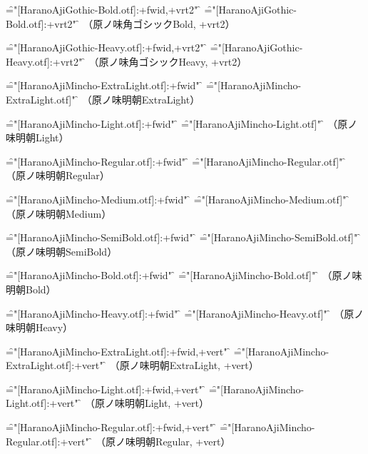 \font\f="[HaranoAjiGothic-Bold.otf]:+fwid,+vrt2" \f
\testfwid
\font\f="[HaranoAjiGothic-Bold.otf]:+vrt2" \f
\test
（原ノ味角ゴシックBold, +vrt2）\par

\font\f="[HaranoAjiGothic-Heavy.otf]:+fwid,+vrt2" \f
\testfwid
\font\f="[HaranoAjiGothic-Heavy.otf]:+vrt2" \f
\test
（原ノ味角ゴシックHeavy, +vrt2）\par


\font\f="[HaranoAjiMincho-ExtraLight.otf]:+fwid" \f
\testfwid
\font\f="[HaranoAjiMincho-ExtraLight.otf]" \f
\test
（原ノ味明朝ExtraLight）\par

\font\f="[HaranoAjiMincho-Light.otf]:+fwid" \f
\testfwid
\font\f="[HaranoAjiMincho-Light.otf]" \f
\test
（原ノ味明朝Light）\par

\font\f="[HaranoAjiMincho-Regular.otf]:+fwid" \f
\testfwid
\font\f="[HaranoAjiMincho-Regular.otf]" \f
\test
（原ノ味明朝Regular）\par

\font\f="[HaranoAjiMincho-Medium.otf]:+fwid" \f
\testfwid
\font\f="[HaranoAjiMincho-Medium.otf]" \f
\test
（原ノ味明朝Medium）\par

\font\f="[HaranoAjiMincho-SemiBold.otf]:+fwid" \f
\testfwid
\font\f="[HaranoAjiMincho-SemiBold.otf]" \f
\test
（原ノ味明朝SemiBold）\par

\font\f="[HaranoAjiMincho-Bold.otf]:+fwid" \f
\testfwid
\font\f="[HaranoAjiMincho-Bold.otf]" \f
\test
（原ノ味明朝Bold）\par

\font\f="[HaranoAjiMincho-Heavy.otf]:+fwid" \f
\testfwid
\font\f="[HaranoAjiMincho-Heavy.otf]" \f
\test
（原ノ味明朝Heavy）\par


\font\f="[HaranoAjiMincho-ExtraLight.otf]:+fwid,+vert" \f
\testfwid
\font\f="[HaranoAjiMincho-ExtraLight.otf]:+vert" \f
\test
（原ノ味明朝ExtraLight, +vert）\par

\font\f="[HaranoAjiMincho-Light.otf]:+fwid,+vert" \f
\testfwid
\font\f="[HaranoAjiMincho-Light.otf]:+vert" \f
\test
（原ノ味明朝Light, +vert）\par

\font\f="[HaranoAjiMincho-Regular.otf]:+fwid,+vert" \f
\testfwid
\font\f="[HaranoAjiMincho-Regular.otf]:+vert" \f
\test
（原ノ味明朝Regular, +vert）\par

